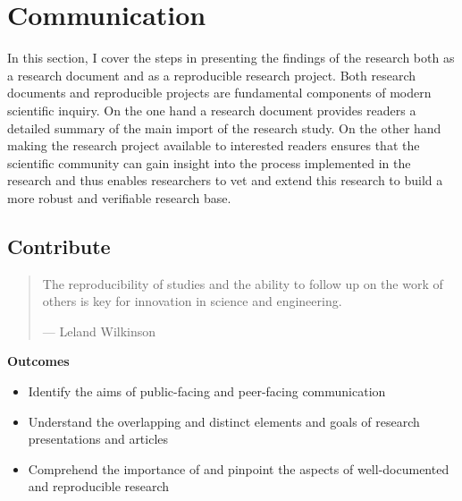 \documentclass[
  letterpaper,
]{latex/krantz}
\providecommand{\tightlist}{%
  \setlength{\itemsep}{0pt}\setlength{\parskip}{0pt}}\usepackage{longtable,booktabs,array}
\theoremstyle{definition}
\theoremstyle{remark}
\begin{document}
\part{Communication}

In this section, I cover the steps in presenting the findings of the
research both as a research document and as a reproducible research
project. Both research documents and reproducible projects are
fundamental components of modern scientific inquiry. On the one hand a
research document provides readers a detailed summary of the main import
of the research study. On the other hand making the research project
available to interested readers ensures that the scientific community
can gain insight into the process implemented in the research and thus
enables researchers to vet and extend this research to build a more
robust and verifiable research base.

\chapter{Contribute}\label{sec-contribute-chapter}

\begin{quote}
The reproducibility of studies and the ability to follow up on the work
of others is key for innovation in science and engineering.

--- Leland Wilkinson
\end{quote}

\begin{tcolorbox}[enhanced jigsaw, breakable, leftrule=.75mm, arc=.35mm, colframe=quarto-callout-color-frame, colback=white, left=2mm, bottomrule=.15mm, rightrule=.15mm, toprule=.15mm, opacityback=0]

\textbf{ Outcomes}

\begin{itemize}
\tightlist
\item
  Identify the aims of public-facing and peer-facing communication
\item
  Understand the overlapping and distinct elements and goals of research
  presentations and articles
\item
  Comprehend the importance of and pinpoint the aspects of
  well-documented and reproducible research
\end{itemize}

\end{tcolorbox}
\end{document}
